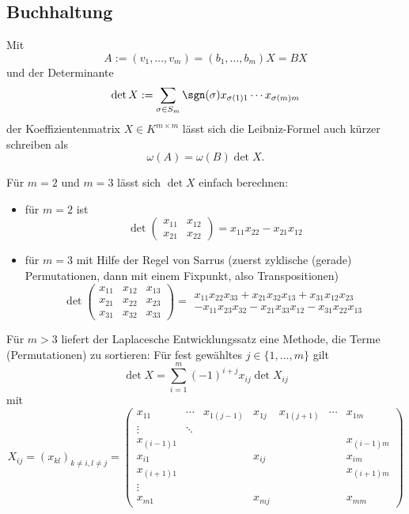 \subsection{Buchhaltung}
	\begin{Definition}[Determinante]
		Mit 
		\[ A:= (v_1,\dots,v_m)=(b_1,\dots,b_m)X = BX \]
	und der Determinante
		\[ \det X := \sum_{\sigma\in S_m}\sgn(\sigma)x_{\sigma(1)1}\cdots x_{\sigma(m)m} \]
	der Koeffizientenmatrix $ X\in K^{m\times m} $ lässt sich die Leibniz-Formel auch kürzer schreiben als
		\[ \omega(A) = \omega(B)\det X. \]
	\end{Definition}
	Für $ m=2 $ und $ m=3 $ lässt sich $ \det X $ einfach berechnen:
		\begin{itemize}
			\item für $ m=2 $ ist
				\[ \det \begin{pmatrix}
						x_{11}& x_{12}\\ x_{21} & x_{22}
					\end{pmatrix}
					= x_{11}x_{22}-x_{21}x_{12}
				\]
			\item für $ m=3 $ mit Hilfe der Regel von Sarrus (zuerst zyklische (gerade) Permutationen, dann mit einem Fixpunkt, also Transpositionen)
				\[ \det \begin{pmatrix}
					x_{11} & x_{12} & x_{13}\\
					x_{21} & x_{22} & x_{23}\\
					x_{31} & x_{32} & x_{33}
				\end{pmatrix}
				 = 	 \begin{matrix}
				 x_{11}x_{22}x_{33}
				 +x_{21}x_{32}x_{13}
				 +x_{31}x_{12}x_{23}\\
				 -x_{11}x_{23}x_{32}
				 -x_{21}x_{33}x_{12}
				 -x_{31}x_{22}x_{13}
				 \end{matrix} \]
			\end{itemize}
	Für $ m>3 $ liefert der Laplacesche Entwicklungssatz eine Methode, die Terme (Permutationen) zu sortieren: Für fest gewähltes $ j\in \{1,\dots, m \} $ gilt
		\[ \det X = \sum_{i=1}^{m}(-1)^{i+j}x_{ij}\det X_{ij} \]
	mit
		\[ X_{ij} = (x_{kl})_{k\neq i, l\neq j} = 
		\begin{pmatrix}
			x_{11} & \cdots & x_{1(j-1)} & x_{1j} & x_{1(j+1)} & \cdots & x_{1m} \\ 
			\vdots & \ddots &  	&  	&  	&  	&  \\ 
			x_{(i-1)1} 	&  	&  	&  	&  	&  	& x_{(i-1)m} \\ 
			x_{i1} 	&	&  	& x_{ij} &  &  	& x_{im} \\ 
			x_{(i+1)1} &  &  &  &  &  & x_{(i+1)m} \\ 
			\vdots &  &  &  &  &  &  \\ 
			x_{m1} &  &  & x_{mj} &  &  & x_{mm}
			\end{pmatrix}  \]
